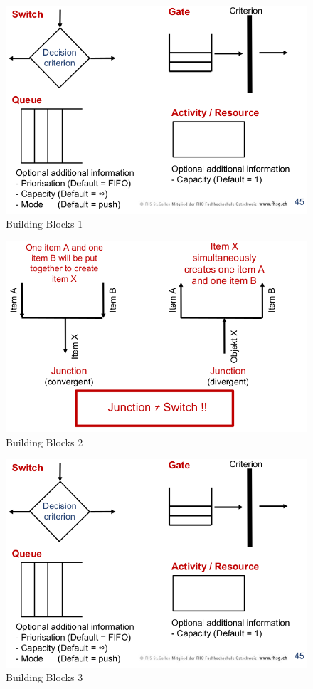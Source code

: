 \begin{figure}
\centering
\includegraphics{figures/flowDiagramBuildingblocks1.png}
\caption{Building Blocks 1}
\end{figure}

\begin{figure}
\centering
\includegraphics{figures/flowDiagramBuildingblocks2.png}
\caption{Building Blocks 2}
\end{figure}

\begin{figure}
\centering
\includegraphics{figures/flowDiagramBuildingblocks1.png}
\caption{Building Blocks 3}
\end{figure}
